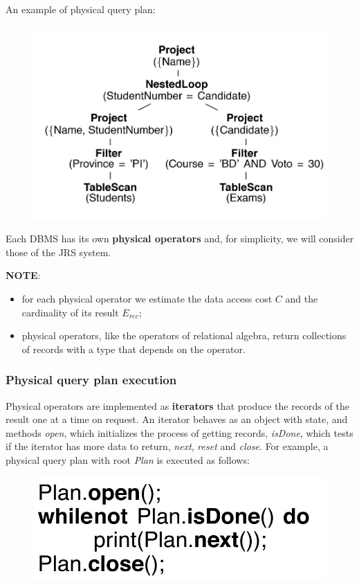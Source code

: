  An example of physical query plan:

 \begin{figure}[h!]
		\centering
		\includegraphics[scale = 0.9]{img/relop2.jpg}
		\label{part6}
\end{figure}

 
Each DBMS has its own \textbf{physical operators} and, for simplicity, we will consider
those of the JRS system. 

\textbf{NOTE}: 
\begin{itemize}
    \item for each physical operator we estimate the data access cost $C$ and the cardinality of its result $E_{rec}$;
    \item physical operators, like the operators of relational algebra, return collections of records with a type that depends on the operator.
\end{itemize} 

\subsubsection{Physical query plan execution}

Physical operators are implemented as \textbf{iterators} that produce the records of the result one at a time on request. An iterator behaves as an object with state, and methods \textit{open}, which initializes the process of getting records, \textit{isDone}, which tests if the iterator has more data to return, \textit{next}, \textit{reset} and \textit{close}.
For example, a physical query plan with root \textit{Plan} is executed as follows:

\begin{figure}[h!]
		\centering
		\includegraphics[scale = 0.7]{img/relop3.jpg}
		\label{part6}
\end{figure}

